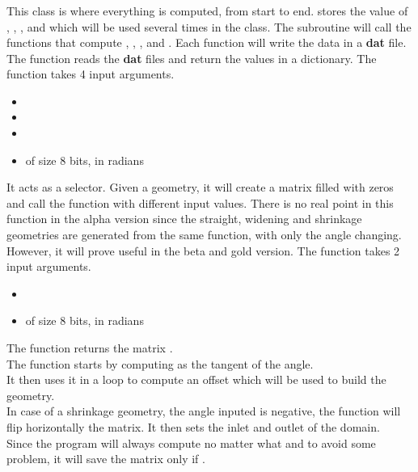 \subsubsection{}
This class is where everything is computed, from start to end.
\smallbreak{}
 stores the value of , , ,  and
 which will be used several times in the class.
\smallbreak{}
The subroutine  will call the functions that compute ,
, ,  and . Each function
will write the data in a \textbf{dat} file.
\smallbreak{}
The function  reads the \textbf{dat} files and return the
values in a dictionary.
\smallbreak{}
The function  takes 4 input arguments.
\begin{itemize}
      \item {}
      \item {}
      \item {}
      \item {} of size 8 bits, in radians
\end{itemize}
It acts as a selector. Given a geometry, it will create a matrix  filled
with zeros and call the function  with different input
values. There is no real point in this function in the alpha version since the
straight, widening and shrinkage geometries are generated from the same
function, with only the angle changing. However, it will prove useful in the
beta and gold version.
\smallbreak{}
The function  takes 2 input arguments.
\begin{itemize}
      \item {} \textcolor{dtype}{}
      \item {} of size 8 bits, in radians
\end{itemize}
The function returns the matrix .\\
The function starts by computing  as the tangent of the angle.\\
It then uses it in a  loop to compute an offset which will be used to
build the geometry.\\
In case of a shrinkage geometry, the angle inputed is negative, the function
will flip horizontally the matrix. It then sets the inlet and outlet of the
domain.\\
Since the program will always compute  no matter what and to avoid some
problem, it will save the matrix only if .
